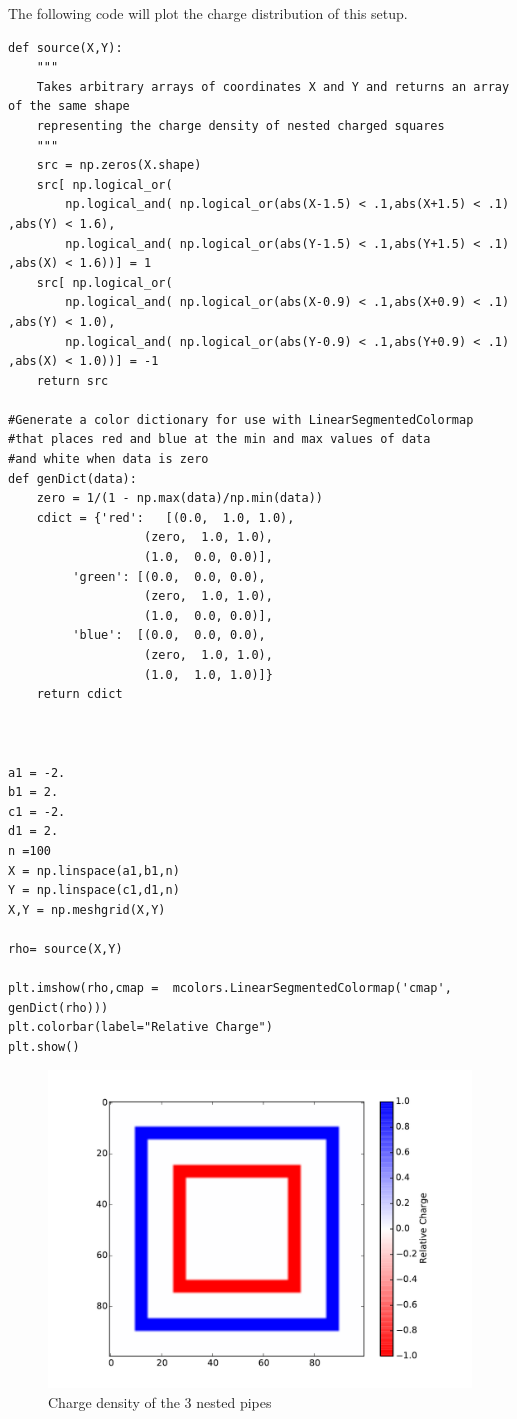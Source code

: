 The following code will plot the charge distribution of this setup.
\begin{lstlisting}
def source(X,Y):
    """
    Takes arbitrary arrays of coordinates X and Y and returns an array of the same shape
    representing the charge density of nested charged squares
    """
    src = np.zeros(X.shape)
    src[ np.logical_or(
        np.logical_and( np.logical_or(abs(X-1.5) < .1,abs(X+1.5) < .1) ,abs(Y) < 1.6),
        np.logical_and( np.logical_or(abs(Y-1.5) < .1,abs(Y+1.5) < .1) ,abs(X) < 1.6))] = 1
    src[ np.logical_or(
        np.logical_and( np.logical_or(abs(X-0.9) < .1,abs(X+0.9) < .1) ,abs(Y) < 1.0),
        np.logical_and( np.logical_or(abs(Y-0.9) < .1,abs(Y+0.9) < .1) ,abs(X) < 1.0))] = -1
    return src

#Generate a color dictionary for use with LinearSegmentedColormap
#that places red and blue at the min and max values of data
#and white when data is zero
def genDict(data):
    zero = 1/(1 - np.max(data)/np.min(data))
    cdict = {'red':   [(0.0,  1.0, 1.0),
                   (zero,  1.0, 1.0),
                   (1.0,  0.0, 0.0)],
         'green': [(0.0,  0.0, 0.0),
                   (zero,  1.0, 1.0),
                   (1.0,  0.0, 0.0)],
         'blue':  [(0.0,  0.0, 0.0),
                   (zero,  1.0, 1.0),
                   (1.0,  1.0, 1.0)]}
    return cdict



a1 = -2.
b1 = 2.
c1 = -2.
d1 = 2.
n =100
X = np.linspace(a1,b1,n)
Y = np.linspace(c1,d1,n)
X,Y = np.meshgrid(X,Y)

rho= source(X,Y)

plt.imshow(rho,cmap =  mcolors.LinearSegmentedColormap('cmap', genDict(rho)))
plt.colorbar(label="Relative Charge")
plt.show()
\end{lstlisting}

\begin{figure}
\includegraphics[width=\textwidth]{pipesRho.pdf}
\caption{Charge density of the 3 nested pipes}
\end{figure}

